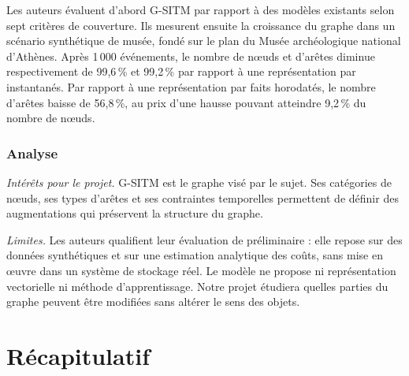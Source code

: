 \documentclass[11pt, french, screen, research-development]{report-rd-info}
\begin{document}
 Les auteurs évaluent d'abord G-SITM par rapport à des modèles existants selon sept critères de
couverture. Ils mesurent ensuite la croissance du graphe dans un scénario synthétique de musée,
fondé sur le plan du Musée archéologique national d'Athènes. Après 1\,000 événements, le nombre de
nœuds et d'arêtes diminue respectivement de 99{,}6\,\% et 99{,}2\,\% par rapport à une
représentation par instantanés. Par rapport à une représentation par faits horodatés, le nombre
d'arêtes baisse de 56{,}8\,\%, au prix d'une hausse pouvant atteindre 9{,}2\,\% du nombre de nœuds.

\subsubsection*{Analyse}

\emph{Intérêts pour le projet.}
 G-SITM est le graphe visé par le sujet. Ses catégories de nœuds, ses types d'arêtes et ses
contraintes temporelles permettent de définir des augmentations qui préservent la structure du
graphe.

\emph{Limites.}
 Les auteurs qualifient leur évaluation de préliminaire : elle repose sur des données synthétiques
et sur une estimation analytique des coûts, sans mise en œuvre dans un système de stockage réel. Le
modèle ne propose ni représentation vectorielle ni méthode d'apprentissage. Notre projet étudiera
quelles parties du graphe peuvent être modifiées sans altérer le sens des objets.

\section{Récapitulatif}
\end{document}
